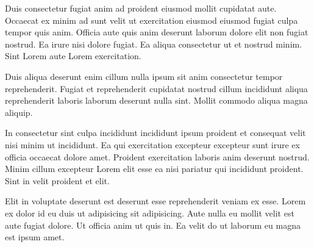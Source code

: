 Duis consectetur fugiat anim ad proident eiusmod mollit cupidatat aute. Occaecat ex minim ad sunt velit ut exercitation eiusmod eiusmod fugiat culpa tempor quis anim. Officia aute quis anim deserunt laborum dolore elit non fugiat nostrud. Ea irure nisi dolore fugiat. Ea aliqua consectetur ut et nostrud minim. Sint Lorem aute Lorem exercitation.

Duis aliqua deserunt enim cillum nulla ipsum sit anim consectetur tempor reprehenderit. Fugiat et reprehenderit cupidatat nostrud cillum incididunt aliqua reprehenderit laboris laborum deserunt nulla sint. Mollit commodo aliqua magna aliquip.

In consectetur sint culpa incididunt incididunt ipsum proident et consequat velit nisi minim ut incididunt. Ea qui exercitation excepteur excepteur sunt irure ex officia occaecat dolore amet. Proident exercitation laboris anim deserunt nostrud. Minim cillum excepteur Lorem elit esse ea nisi pariatur qui incididunt proident. Sint in velit proident et elit.

Elit in voluptate deserunt est deserunt esse reprehenderit veniam ex esse. Lorem ex dolor id eu duis ut adipisicing sit adipisicing. Aute nulla eu mollit velit est aute fugiat dolore. Ut officia anim ut quis in. Ea velit do ut laborum eu magna est ipsum amet.
